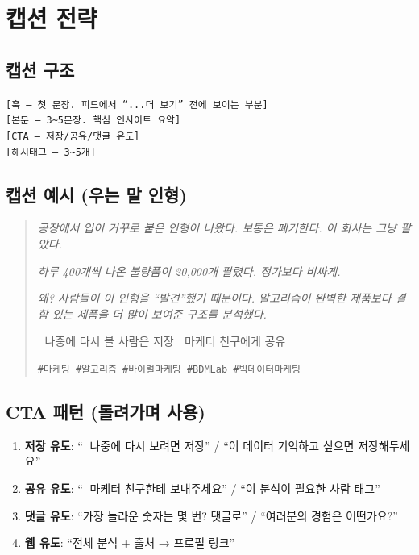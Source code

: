 \documentclass[11pt, a4paper]{article}
\begin{document}

\section{캡션 전략}

\subsection{캡션 구조}

\begin{tcolorbox}[colback=white, colframe=darkbg]
\texttt{[훅 — 첫 문장. 피드에서 ``...더 보기'' 전에 보이는 부분]} \\[4pt]
\texttt{[본문 — 3\textasciitilde 5문장. 핵심 인사이트 요약]} \\[4pt]
\texttt{[CTA — 저장/공유/댓글 유도]} \\[4pt]
\texttt{[해시태그 — 3\textasciitilde 5개]}
\end{tcolorbox}

\subsection{캡션 예시 (우는 말 인형)}

\begin{quote}
\textit{공장에서 입이 거꾸로 붙은 인형이 나왔다. 보통은 폐기한다. 이 회사는 그냥 팔았다.}

\textit{하루 400개씩 나온 불량품이 20,000개 팔렸다. 정가보다 비싸게.}

\textit{왜? 사람들이 이 인형을 ``발견''했기 때문이다. 알고리즘이 완벽한 제품보다 결함 있는 제품을 더 많이 보여준 구조를 분석했다.}

💾 나중에 다시 볼 사람은 저장 \quad 📩 마케터 친구에게 공유

\texttt{\#마케팅 \#알고리즘 \#바이럴마케팅 \#BDMLab \#빅데이터마케팅}
\end{quote}

\subsection{CTA 패턴 (돌려가며 사용)}

\begin{enumerate}[leftmargin=2em]
  \item \textbf{저장 유도}: ``💾 나중에 다시 보려면 저장'' / ``이 데이터 기억하고 싶으면 저장해두세요''
  \item \textbf{공유 유도}: ``📩 마케터 친구한테 보내주세요'' / ``이 분석이 필요한 사람 태그''
  \item \textbf{댓글 유도}: ``가장 놀라운 숫자는 몇 번? 댓글로'' / ``여러분의 경험은 어떤가요?''
  \item \textbf{웹 유도}: ``전체 분석 + 출처 → 프로필 링크''
\end{enumerate}
\end{document}
